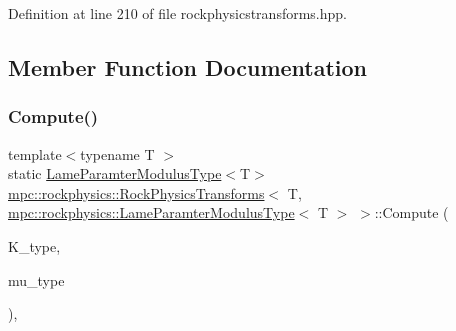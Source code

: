 Definition at line 210 of file rockphysicstransforms.\+hpp.



\subsection{Member Function Documentation}
\mbox{\label{structmpc_1_1rockphysics_1_1_rock_physics_transforms_3_01_t_00_01mpc_1_1rockphysics_1_1_lame_para5e1496021e3962f82419b3f52eb8942_a7988cdb91290059837fc3c1e6e2cb557}} 
\subsubsection{\texorpdfstring{Compute()}{Compute()}\hspace{0.1cm}{\footnotesize\ttfamily [1/7]}}
{\footnotesize\ttfamily template$<$typename T $>$ \\
static \mbox{\hyperlink{structmpc_1_1rockphysics_1_1_lame_paramter_modulus_type}{Lame\+Paramter\+Modulus\+Type}}$<$T$>$ \mbox{\hyperlink{structmpc_1_1rockphysics_1_1_rock_physics_transforms}{mpc\+::rockphysics\+::\+Rock\+Physics\+Transforms}}$<$ T, \mbox{\hyperlink{structmpc_1_1rockphysics_1_1_lame_paramter_modulus_type}{mpc\+::rockphysics\+::\+Lame\+Paramter\+Modulus\+Type}}$<$ T $>$ $>$\+::Compute (\begin{DoxyParamCaption}\item[{const \mbox{\hyperlink{structmpc_1_1rockphysics_1_1_bulk_modulus_type}{mpc\+::rockphysics\+::\+Bulk\+Modulus\+Type}}$<$ T $>$ \&}]{K\+\_\+type,  }\item[{const \mbox{\hyperlink{structmpc_1_1rockphysics_1_1_shear_modulus_type}{mpc\+::rockphysics\+::\+Shear\+Modulus\+Type}}$<$ T $>$ \&}]{mu\+\_\+type }\end{DoxyParamCaption})\hspace{0.3cm}{\ttfamily [inline]}, {\ttfamily [static]}}



